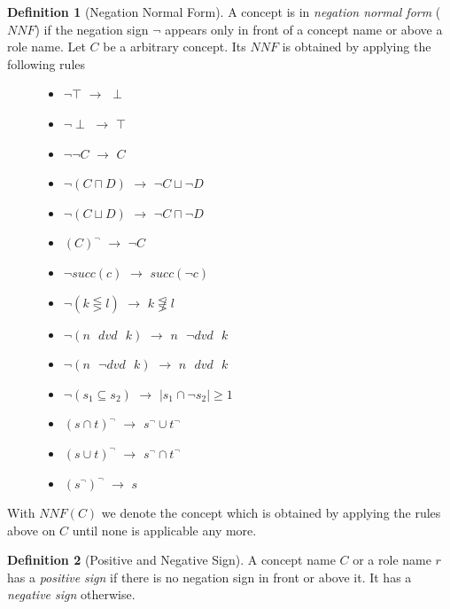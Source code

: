 \documentclass[a4paper,11pt]{scrartcl}
\theoremstyle{break}
\theoremstyle{definition}
\newtheorem{mydef}{Definition}
\begin{document}
\begin{mydef}[Negation Normal Form]
A concept is in \textit{negation normal form} ($NNF$) if the negation sign $\neg$ appears only in front of a concept name or above a role name. Let $C$ be a arbitrary concept. Its $NNF$ is obtained by applying the following rules
\begin{figure}[H]
\begin{minipage}[t]{.5\textwidth}
\raggedright
\begin{itemize}
\item $\neg\top$ $\rightarrow$ $\perp$
\item $\neg\perp$ $\rightarrow$ $\top$
\item $\neg\neg C$ $\rightarrow$ $C$
\item $\neg(C\sqcap D)$ $\rightarrow$ $\neg C \sqcup \neg D$
\item $\neg(C\sqcup D)$ $\rightarrow$ $\neg C \sqcap \neg D$
\item $(C)^\neg$ $\rightarrow$ $\neg C$
\item $\neg succ(c)$ $\rightarrow$ $succ(\neg c)$
\end{itemize}
\end{minipage}%
\begin{minipage}[t]{.5\textwidth}
\raggedleft
\begin{itemize}
\item $\neg (k\lesseqgtr l)$ $\rightarrow$ $k\not\lesseqgtr l$
\item $\neg (n\text{ } dvd \text{ } k)$ $\rightarrow$ $n\text{ } \neg dvd \text{ } k$
\item $\neg (n\text{ } \neg dvd \text{ } k)$ $\rightarrow$ $n\text{ } dvd \text{ } k$
\item $\neg (s_1\subseteq s_2)$ $\rightarrow$ $|s_1\cap\neg s_2|\geq 1$
\item $(s\cap t)^\neg$ $\rightarrow$ $s^\neg \cup t^\neg$
\item $(s\cup t)^\neg$ $\rightarrow$ $s^\neg \cap t^\neg$
\item $(s^\neg)^\neg$ $\rightarrow$ $s$
\end{itemize}
\end{minipage}
\end{figure}
\end{mydef}
With $NNF(C)$ we denote the concept which is obtained by applying the rules above on $C$ until none is applicable any more.
\begin{mydef}[Positive and Negative Sign]
A concept name $C$ or a role name $r$ has a \textit{positive sign} if there is no negation sign in front or above it. It has a \textit{negative sign} otherwise.
\end{mydef}
\end{document}
